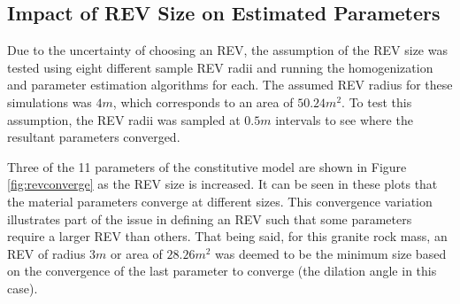 \subsection{Impact of REV Size on Estimated Parameters}

Due to the uncertainty of choosing an REV, the assumption of the REV size was tested using eight different sample REV radii and running the homogenization and parameter estimation algorithms for each. The assumed REV radius for these simulations was $4m$, which corresponds to an area of $50.24 m^2$. To test this assumption, the REV radii was sampled at $0.5m$ intervals to see where the resultant parameters converged.

Three of the 11 parameters of the constitutive model are shown in Figure \ref{fig:revconverge} as the REV size is increased. It can be seen in these plots that the material parameters converge at different sizes. This convergence variation illustrates part of the issue in defining an REV such that some parameters require a larger REV than others. That being said, for this granite rock mass, an REV of radius $3m$ or area of $28.26 m^2$ was deemed to be the minimum size based on the convergence of the last parameter to converge (the dilation angle in this case).